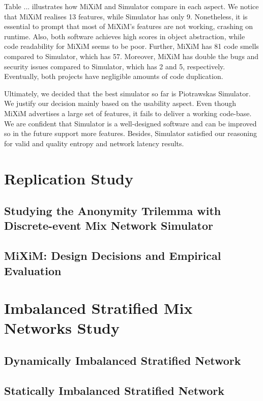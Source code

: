\documentclass[logo,msc,cyber]{infthesis}   %
\begin{document}
Table ... illustrates how MiXiM and Simulator compare in each aspect. We
notice that MiXiM realises 13 features, while Simulator has only 9.
Nonetheless, it is essential to prompt that most of MiXiM's features are not
working, crashing on runtime. Also, both software achieves high scores in
object abstraction, while code readability for MiXiM seems to be poor.
Further, MiXiM has 81 code smells compared to Simulator, which has 57.
Moreover, MiXiM has double the bugs and security issues compared to
Simulator, which has 2 and 5, respectively. Eventually, both projects have
negligible amounts of code duplication.

Ultimately, we decided that the best simulator so far is Piotrawskas
Simulator. We justify our decision mainly based on the usability aspect.
Even though MiXiM advertises a large set of features, it fails to deliver a
working code-base. We are confident that Simulator is a well-designed
software and can be improved so in the future support more features.
Besides, Simulator satisfied our reasoning for valid and quality entropy and
network latency results. 

\chapter{Replication Study}

\section{Studying the Anonymity Trilemma with Discrete-event Mix Network Simulator}

\section{MiXiM: Design Decisions and Empirical Evaluation}

\chapter{Imbalanced Stratified Mix Networks Study}

\section{Dynamically Imbalanced Stratified Network}

\section{Statically Imbalanced Stratified Network}
\end{document}
